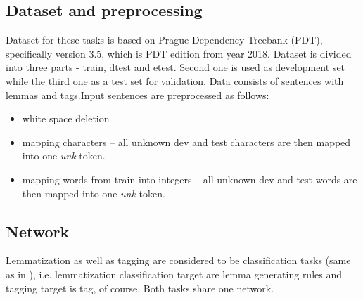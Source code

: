 \subsection{Dataset and preprocessing}
Dataset for these tasks is based on Prague Dependency Treebank (PDT), specifically version 3.5, which is PDT edition from year 2018. Dataset is divided into three parts - train, dtest and etest. Second one is used as development set while the third one as a test set for validation. %
Data consists of sentences with lemmas and tags.Input sentences are preprocessed as follows:
\begin{itemize}
\item white space deletion
\item mapping characters -- all unknown dev and test characters are then mapped into one \textit{unk} token. 
\item mapping  words from train into integers -- all unknown dev and test words are then mapped into one \textit{unk} token. 
\end{itemize}




		
\subsection{Network}
Lemmatization as well as tagging are considered to be classification tasks (same as in \cite[]{straka2019czech}), i.e. lemmatization classification target are lemma generating rules and tagging target is tag, of course. Both tasks share one network.

